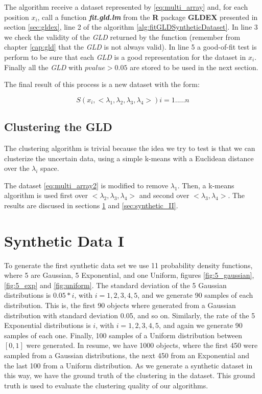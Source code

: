 The algorithm receive a dataset represented by \ref{eq:multi_array} and, for each position $x_{i}$, call a function \textbf{\textit{fit.gld.lm}} from the \textbf{R} package \textbf{GLDEX} presented in section \ref{sec:gldex}, line 2 of the algorithm \ref{alg:fitGLDSyntheticDataset}. In line 3 we check the validity of the \textit{GLD} returned by the function (remember from chapter \ref{cap:gld} that the \textit{GLD} is not always valid). In line 5 a good-of-fit test is perform to be sure that each \textit{GLD} is a good representation for the dataset in $x_{i}$. Finally all the \textit{GLD} with $pvalue > 0.05$ are stored to be used in the next section.

The final result of this process is a new dataset with the form:

\begin{equation}\label{eq:multi_array2}
S(x_{i}, <\lambda_{1},\lambda_{2},\lambda_{3},\lambda_{4}>)  i=1.....n
\end{equation}

\subsection{Clustering the GLD}\label{sub:clustering_gld}

The clustering algorithm is trivial because the idea we try to test is that we can clusterize the uncertain data, using a simple k-means with a Euclidean distance over the $\lambda_{i}$ space.

The dataset \ref{eq:multi_array2} is modified to remove $\lambda_{1}$. Then, a k-means algorithm is used first over $<\lambda_{2},\lambda_{3},\lambda_{4}>$ and second over $<\lambda_{3},\lambda_{4}>$. The results are discused in sections \ref{sec:synthetic_I} and \ref{sec:synthetic_II}.

\section{Synthetic Data I}\label{sec:synthetic_I}
To generate the first synthetic data set we use 11 probability density functions, where 5 are Gaussian, 5 Exponential, and one Uniform, figures \ref{fig:5_gaussian}, \ref{fig:5_exp} and \ref{fig:uniform}. The standard deviation of the 5 Gaussian distributions is $0.05*i$, with $i=1, 2, 3, 4, 5$, and we generate 90 samples of each distribution. This is, the first 90 objects where generated from a Gaussian distribution with standard deviation 0.05, and so on. Similarly, the rate of the 5 Exponential distributions is $i$, with $i=1, 2, 3, 4, 5$, and again we generate 90 samples of each one. Finally, 100 samples of a Uniform distribution between $[0, 1]$ were generated. In resume, we have 1000 objects, where the first 450 were sampled from a Gaussian distributions, the next 450 from an Exponential and the last 100 from a Uniform distribution. As we generate a synthetic dataset in this way, we have the ground truth of the clustering in the dataset. This ground truth is used to evaluate the clustering quality of our algorithms.

